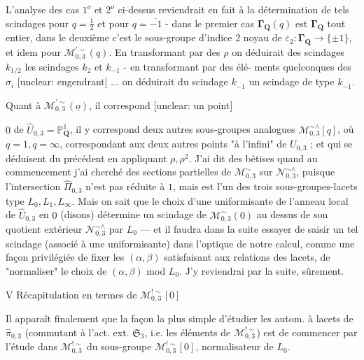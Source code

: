 \begin{enumerate}
L'analyse des cas
$1^o$ et $2^o$ ci-dessus reviendrait en fait à
la détermination de tels scindages pour
$q = \frac{1}{2}$ et pour $q = \overline{-1}$ - dans le premier
cas $\boldsymbol{\Gamma}_{\mathbf{Q}}(q)$ est $\boldsymbol{\Gamma}_{\mathbf{Q}}$ tout entier, dans le
deuxième c'est le sous-groupe d'indice 2
noyau de $\varepsilon_2 : \boldsymbol{\Gamma}_{\mathbf{Q}} \to \{ \pm 1 \}$, et idem pour
$\mathcal{M}_{0,3}^{\prime \sim}(q)$. En transformant par des $\rho$
on déduirait des scindages $k_{1/2}$ les scindages
$k_2$ et $k_{-1}$ - en transformant par des élé-
ments quelconques des $\sigma_i$ [unclear: engendrant] $\dots$ on
déduirait du scindage $k_{\overline{-1}}$ un scindage de
type $k_{\overline{-1}}$.

Quant à $\mathcal{M}_{0,3}^{\prime \sim}(\underline{o})$, il correspond [unclear: un point]

\newpage


$0$ de $\hat{U}_{0,3} = \mathbb{P}^1_{\mathbf{Q}}$, il y correspond deux autres sous-groupes analogues $\mathcal{M}_{0,3}^{\sim \wedge}[q]$, où $q=1, q=\infty$, correspondant aux deux autres points "à l'infini" de $U_{0,3}$ ; et qui se déduisent du précédent en appliquant $\rho, \rho^2$. J'ai dit des bêtises quand au commencement j'ai cherché des sections partielles de $\mathcal{M}_{0,3}^\sim$ sur $\mathcal{N}_{0,3}^{\sim \wedge}$, puisque l'intersection $\hat{\Pi}_{0,3}$ n'est pas réduite à $1$, mais est l'un des trois sous-groupes-lacets type $L_0, L_1, L_\infty$. Mais on sait que le choix d'une uniformisante de l'anneau local de $\hat{U}_{0,3}$ en $0$ (disons) détermine un scindage de $\mathcal{M}_{0,3}^\sim(0)$ au dessus de son quotient extérieur $\mathcal{N}_{0,3}^{\sim \wedge}$ par $L_0$ — et il faudra dans la suite essayer de saisir un tel scindage (associé à une uniformisante) dans l'optique de notre calcul, comme une façon privilégiée de fixer les $(\alpha, \beta)$ satisfaisant aux relations des lacets, de "normaliser" le choix de $(\alpha, \beta)$ mod $L_0$. J'y reviendrai par la suite, sûrement.

\newpage


V Récapitulation en termes de $\mathcal{M}_{0,3}^{!\sim}[0]$

Il apparaît finalement que la façon la plus
simple d'étudier les autom. à lacets de $\hat{\pi}_{0,3}$
(commutant à l'act. ext. $\mathfrak{S}_3$, i.e. les éléments de
$\mathcal{M}_{0,3}^{!\sim}$) est de commencer par l'étude dans $\mathcal{M}_{0,3}^{!\sim}$
du sous-groupe $\mathcal{M}_{0,3}^{!\sim}[0]$, normalisateur de $L_0$.


\end{enumerate}

